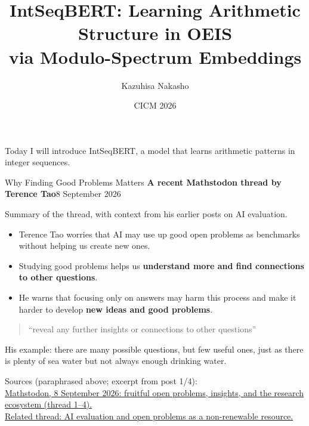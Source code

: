 \documentclass[aspectratio=169,10pt]{beamer}
\title{IntSeqBERT: Learning Arithmetic Structure in OEIS\texorpdfstring{\\}{ }via Modulo-Spectrum Embeddings}
\author{Kazuhisa Nakasho}
\institute{Iwate Prefectural University, Japan\\[1ex]
  Code \& data: \texttt{github.com/aabaa/IntSeqBERT}}
\date{CICM 2026}
\newcommand{\tightlist}{\setlength{\itemsep}{0.2em}}
\newcommand{\readout}[1]{\textcolor{readoutblue}{{\mdseries #1}}}
\begin{document}
\begin{frame}[plain]
  \medskip
  {\small\readout{Today I will introduce IntSeqBERT, a model that learns arithmetic patterns in integer sequences.}}
\end{frame}

\begin{frame}{Why Finding Good Problems Matters}
\small
\setlength{\parskip}{0pt}
  \textbf{A recent Mathstodon thread by Terence Tao}\hfill{\footnotesize 8 September 2026}
  \par\smallskip
  {\scriptsize Summary of the thread, with context from his earlier posts on AI evaluation.}
  \begin{itemize}\tightlist
    \item \readout{Terence Tao worries that AI may use up good open problems
          as benchmarks without helping us create new ones.}
    \item \readout{Studying good problems helps us \textbf{understand more and find connections to other questions}.}
    \item \readout{He warns that focusing only on answers may harm this process and make it harder
          to develop \textbf{new ideas and good problems}.}
  \end{itemize}
  \smallskip
  \begin{quote}\footnotesize
    ``reveal any further insights or connections to other questions''
  \end{quote}
  {\footnotesize His example: there are many possible questions, but few useful ones,
  just as there is plenty of sea water but not always enough drinking water.}
  \par\medskip
  {\scriptsize Sources (paraphrased above; excerpt from post 1/4):\\
    \href{https://mathstodon.xyz/@tao/117237320796901560}{Mathstodon, 8 September 2026: fruitful open problems, insights, and the research ecosystem (thread 1--4).}\\
    \href{https://mathstodon.xyz/@tao/117204929023813310}{Related thread: AI evaluation and open problems as a non-renewable resource.}}
\end{frame}
\end{document}
